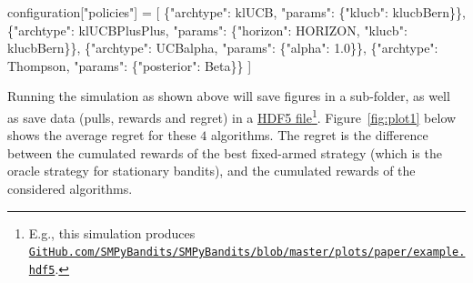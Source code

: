 \documentclass[a4paper,10pt,]{article}
\newenvironment{Shaded}{}{}
\newcommand{\DecValTok}[1]{\textcolor[rgb]{0.25,0.63,0.44}{#1}}
\newcommand{\NormalTok}[1]{#1}
\newcommand{\OperatorTok}[1]{\textcolor[rgb]{0.40,0.40,0.40}{#1}}
\newcommand{\StringTok}[1]{\textcolor[rgb]{0.25,0.44,0.63}{#1}}
\begin{document}
\begin{Shaded}
\begin{Highlighting}[]
\NormalTok{configuration[}\StringTok{"policies"}\NormalTok{] }\OperatorTok{=}\NormalTok{ [}
\NormalTok{  \{}\StringTok{"archtype"}\NormalTok{: klUCB, }\StringTok{"params"}\NormalTok{: \{}\StringTok{"klucb"}\NormalTok{: klucbBern\}\},}
\NormalTok{  \{}\StringTok{"archtype"}\NormalTok{: klUCBPlusPlus, }\StringTok{"params"}\NormalTok{: \{}\StringTok{"horizon"}\NormalTok{: HORIZON, }\StringTok{"klucb"}\NormalTok{: klucbBern\}\},}
\NormalTok{  \{}\StringTok{"archtype"}\NormalTok{: UCBalpha, }\StringTok{"params"}\NormalTok{: \{}\StringTok{"alpha"}\NormalTok{: }\DecValTok{1.0}\NormalTok{\}\},}
\NormalTok{  \{}\StringTok{"archtype"}\NormalTok{: Thompson, }\StringTok{"params"}\NormalTok{: \{}\StringTok{"posterior"}\NormalTok{: Beta\}\}}
\NormalTok{]}
\end{Highlighting}
\end{Shaded}

Running the simulation as shown above will save figures in a sub-folder,
as well as save data (pulls, rewards and regret) in a \href{http://docs.h5py.org/en/stable/high/file.html}{HDF5 file}\footnote{E.g., this simulation produces \href{https://GitHub.com/SMPyBandits/SMPyBandits/blob/master/plots/paper/example.hdf5}{\texttt{GitHub.com/SMPyBandits/SMPyBandits/blob/master/plots/paper/example.hdf5}}.}.
Figure~\ref{fig:plot1} below shows the average regret for these \(4\)
algorithms. The regret is the difference between the cumulated rewards
of the best fixed-armed strategy (which is the oracle strategy for
stationary bandits), and the cumulated rewards of the considered
algorithms.
\end{document}
